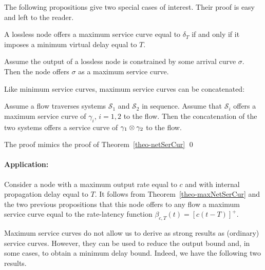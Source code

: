 The following propositions give two special cases of interest.
Their proof is easy and left to the reader.
\begin{proposition}
A lossless node offers a maximum service curve equal to $\delta_T$
if and only if it imposes a minimum virtual delay equal to $T$.
\end{proposition}
\begin{proposition}
Assume the output of a lossless node is constrained by some
arrival curve $\sigma$. Then the node offers $\sigma$ as a maximum
service curve.
\end{proposition}

Like minimum service curves, maximum service curves can be
concatenated:

\begin{theorem}
Assume a flow traverses systems $\mathcal{S}_{1}$ and
$\mathcal{S}_{2}$ in sequence.  Assume that $\mathcal{S}_{i}$
offers a maximum service curve of $\gamma_{i}$, $i=1,2$ to the
flow. Then the concatenation of the two systems offers a service
curve of $\gamma_{1} \otimes \gamma_{2}$ to the flow.
\end{theorem}
\pr The proof mimics the proof of Theorem~\ref{theo-netSerCur}
\qed

\paragraph{Application: }
Consider a node with a maximum output rate equal to $c$ and with
internal propagation delay equal to $T$. It follows from
Theorem~\ref{theo-maxNetSerCur} and the two previous propositions
that this node offers to any flow a maximum service curve equal to
the rate-latency function $\beta_{c,T}(t)=\left[c(t-T) \right]^+$.

Maximum service curves do not allow us to derive as strong results
as (ordinary) service curves. However, they can be used to reduce
the output bound and, in some cases, to obtain a minimum delay
bound. Indeed, we have the following two results.


